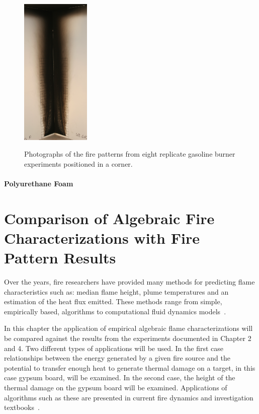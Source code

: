 \documentclass[twoside]{uocthesis}
\begin{document}
\begin{figure}[p]
	\includegraphics[width=1.3in]{../Figures/GBGas10C_IMG_9818} \\

	\caption[Photographs of the fire patterns from eight replicate gasoline burner experiments positioned in a corner]{Photographs of the fire patterns from eight replicate gasoline burner experiments positioned in a corner.}
	\label{Gas_Corner}
\end{figure}


\subsubsection{Polyurethane Foam}






\chapter{Comparison of Algebraic Fire Characterizations with Fire Pattern Results}

Over the years, fire researchers have provided many methods for predicting flame characteristics such as: median flame height, plume temperatures and an estimation of the heat flux emitted. These methods range from simple, empirically based, algorithms to computational fluid dynamics models~\cite{Beyler:1986,Beyler:1999,FDS_Users_Guide,FDS_Tech_Guide}.  

In this chapter the application of empirical algebraic flame characterizations will be compared against the results from the experiments documented in Chapter 2 and 4. Two different types of applications will be used.  In the first case relationships between the energy generated by a given fire source and the potential to transfer enough heat to generate thermal damage on a target, in this case gypsum board, will be examined.  In the second case, the height of the thermal damage on the gypsum board will be examined. Applications of algorithms such as these are presented in current fire dynamics and investigation textbooks~\cite{Icove:2013,Quintiere:1997,Asseal:2010,Beyler:1999}. 
\end{document}
